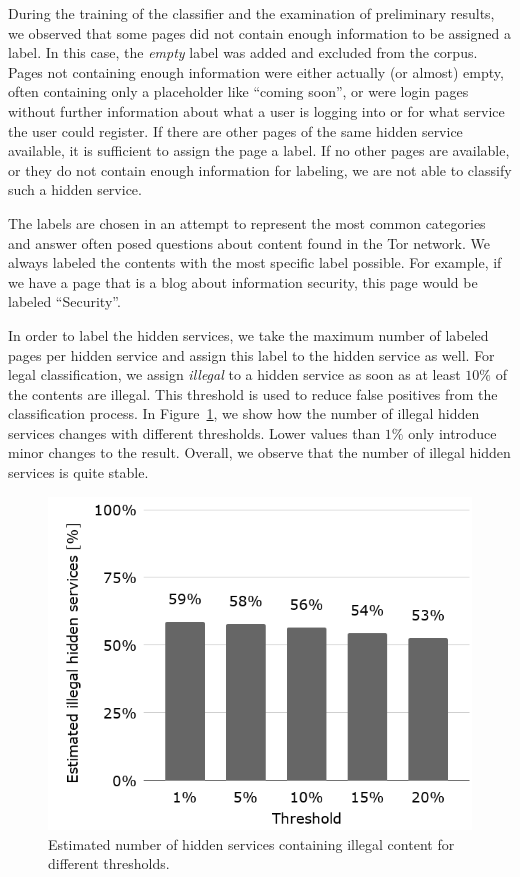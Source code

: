 \documentclass[USenglish,oneside,twocolumn]{article}
\begin{document}
During  the training of the classifier and the examination of preliminary results, we observed that some pages did not contain enough information to be assigned a label. In this case, the \emph{empty} label was added and excluded from the corpus. Pages not containing enough information were either actually (or almost) empty, often containing only a placeholder like ``coming soon'', or were login pages without further information about what a user is logging into or for what service the user could register. If there are other pages of the same hidden service available, it is sufficient to assign the page a label. If no other pages are available, or they do not contain enough information for labeling, we are not able to classify such a hidden service.

The labels are chosen in an attempt to represent the most common categories and answer often posed questions about content found in the Tor network.
We always labeled the contents with the most specific label possible. For example, if we have a page that is a blog about information security, this page would be labeled ``Security''.

In order to label the hidden services, we take the maximum number of labeled pages per hidden service and assign this label to the hidden service as well. For legal classification, we assign \emph{illegal} to a hidden service as soon as at least $10\%$ of the contents are illegal. This threshold is used to reduce false positives from the classification process. In Figure~\ref{fig:legalityByThreshold}, we show how the number of illegal hidden services changes with different thresholds. Lower values than $1\%$ only introduce minor changes to the result. Overall, we observe that  the number of illegal hidden services is quite stable.
 


\begin{figure}
    \centering
    \includegraphics[width=0.8 \linewidth]{images/legalHostsByThreshold.png}
    \caption{Estimated number of hidden services containing illegal content for different thresholds.}
    \label{fig:legalityByThreshold}
\end{figure}
\end{document}
